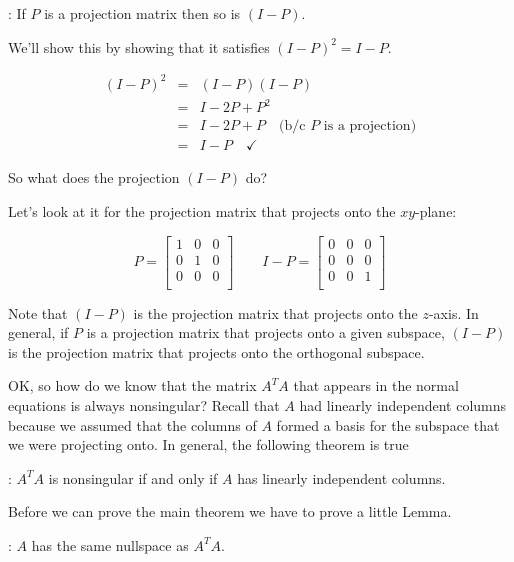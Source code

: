 \documentclass[12pt]{article}
\newcommand{\nin}{\noindent}
\newcommand{\nn}{\nonumber}
\newcommand{\vthree}{\vspace{3mm}}
\newcommand{\myp}[1]{\left( #1 \right)}
\newcommand{\beq}{\begin{eqnarray}}
\newcommand{\eeq}{\end{eqnarray}}
\newcommand{\mymat}[1]{
\left[
\begin{array}{rrrrrrrrrrrrrrrrrrrrrrrrrrrrrrrrrrrrrrr}
#1
\end{array}
\right]
}
\begin{document}
\vthree

\nin {\bf Fact}: If $P$ is a projection matrix then so is $\myp{I-P}$.

\vthree

\nin We'll show this by showing that it satisfies $\myp{I-P}^2 = I-P$.

\beq
\nn \myp{I-P}^2 &=& \myp{I-P} \myp{I-P} \\
\nn             &=& I - 2P + P^2 \\
\nn             &=& I - 2P + P  \quad \textrm{(b/c } P \textrm{ is a projection)}\\
\nn             &=& I - P \quad \checkmark
\eeq

\vthree

\nin So what does the projection $\myp{I-P}$ do?

\vthree

\nin Let's look at it for the projection matrix that projects onto the $xy$-plane:

\[
P =
\mymat{
1 & 0 & 0 \\
0 & 1 & 0 \\
0 & 0 & 0 \\
}
\quad \quad
I - P =
\mymat{
0 & 0 & 0 \\
0 & 0 & 0 \\
0 & 0 & 1 \\
}
\]

\vthree

\nin Note that $\myp{I-P}$ is the projection matrix that projects onto the $z$-axis.  In general, if $P$ is a projection matrix that projects onto a given subspace, $\myp{I-P}$ is the projection matrix that projects onto the orthogonal subspace.

\clearpage

\nin OK, so how do we know that the matrix $A^TA$ that appears in the normal equations is always nonsingular?  Recall that $A$ had linearly independent columns because we assumed that the columns of $A$ formed a basis for the subspace that we were projecting onto. In general, the following theorem is true

\vthree

\nin {\bf Thorem}: $A^TA$ is nonsingular if and only if $A$ has linearly independent columns.

\vthree

\nin Before we can prove the main theorem we have to prove a little Lemma.

\vthree

\nin {\bf Lemma}: $A$ has the same nullspace as $A^TA$.
\end{document}
